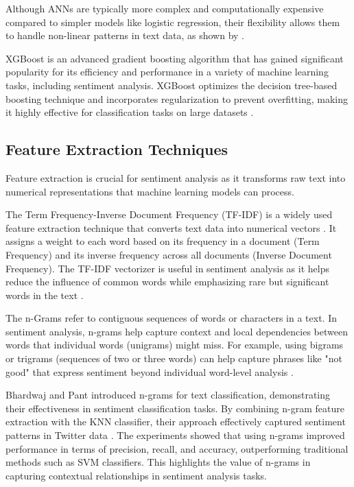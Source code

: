 Although ANNs are typically more complex and computationally expensive compared to simpler models like logistic regression, their flexibility allows them to handle non-linear patterns in text data, as shown by \cite{Collobert2011}.

XGBoost is an advanced gradient boosting algorithm that has gained significant popularity for its efficiency and performance in a variety of machine learning tasks, including sentiment analysis. XGBoost optimizes the decision tree-based boosting technique and incorporates regularization to prevent overfitting, making it highly effective for classification tasks on large datasets \cite{Bentejac2019}.

\subsection{Feature Extraction Techniques}

Feature extraction is crucial for sentiment analysis as it transforms raw text into numerical representations that machine learning models can process.

The Term Frequency-Inverse Document Frequency (TF-IDF) is a widely used feature extraction technique that converts text data into numerical vectors \cite{Semary2024}. It assigns a weight to each word based on its frequency in a document (Term Frequency) and its inverse frequency across all documents (Inverse Document Frequency). The TF-IDF vectorizer is useful in sentiment analysis as it helps reduce the influence of common words while emphasizing rare but significant words in the text \cite{Nguyen2014}.

The n-Grams refer to contiguous sequences of words or characters in a text. In sentiment analysis, n-grams help capture context and local dependencies between words that individual words (unigrams) might miss. For example, using bigrams or trigrams (sequences of two or three words) can help capture phrases like "not good" that express sentiment beyond individual word-level analysis \cite{Ojo2021}.

Bhardwaj and Pant introduced n-grams for text classification, demonstrating their effectiveness in sentiment classification tasks. By combining n-gram feature extraction with the KNN classifier, their approach effectively captured sentiment patterns in Twitter data \cite{Bhardwaj2019}. The experiments showed that using n-grams improved performance in terms of precision, recall, and accuracy, outperforming traditional methods such as SVM classifiers. This highlights the value of n-grams in capturing contextual relationships in sentiment analysis tasks.

